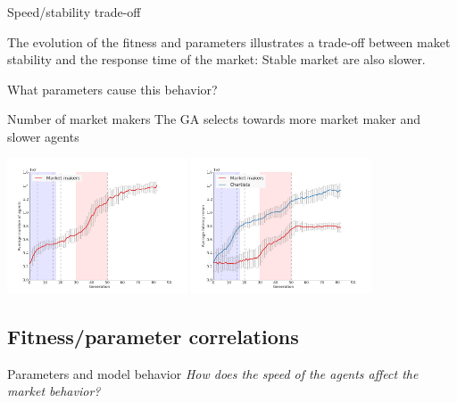 \documentclass[14pt]{beamer}
\begin{document}
\begin{frame}

\end{frame}

\begin{frame}{Speed/stability trade-off}
\begin{block}{}
The evolution of the fitness and parameters illustrates a trade-off between maket stability and the response time of the market: Stable market are also slower.
\end{block}
What parameters cause this behavior?
\end{frame}


\begin{frame}{Number of market makers}
The GA selects towards more market maker and slower agents
\begin{center}
\includegraphics[width=0.4\textwidth]{evolution/nAgents.png}
\includegraphics[width=0.4\textwidth]{evolution/latpars_mu.png}
\end{center}
\end{frame}



\subsection{Fitness/parameter correlations}
\begin{frame}
\tableofcontents[currentsubsection]
\end{frame}


\begin{frame}{Parameters and model behavior}
\textit{How does the speed of the agents affect the market behavior?}
\end{frame}
\end{document}
